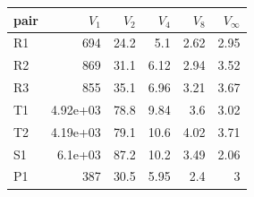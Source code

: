 \begin{tabular}{lrrrrr}
\toprule
pair & $V_1$ & $V_2$ & $V_4$ & $V_8$ & $V_\infty$ \\
\midrule
R1 & 694 & 24.2 & 5.1 & 2.62 & 2.95 \\
R2 & 869 & 31.1 & 6.12 & 2.94 & 3.52 \\
R3 & 855 & 35.1 & 6.96 & 3.21 & 3.67 \\
T1 & 4.92e+03 & 78.8 & 9.84 & 3.6 & 3.02 \\
T2 & 4.19e+03 & 79.1 & 10.6 & 4.02 & 3.71 \\
S1 & 6.1e+03 & 87.2 & 10.2 & 3.49 & 2.06 \\
P1 & 387 & 30.5 & 5.95 & 2.4 & 3 \\
\bottomrule
\end{tabular}
